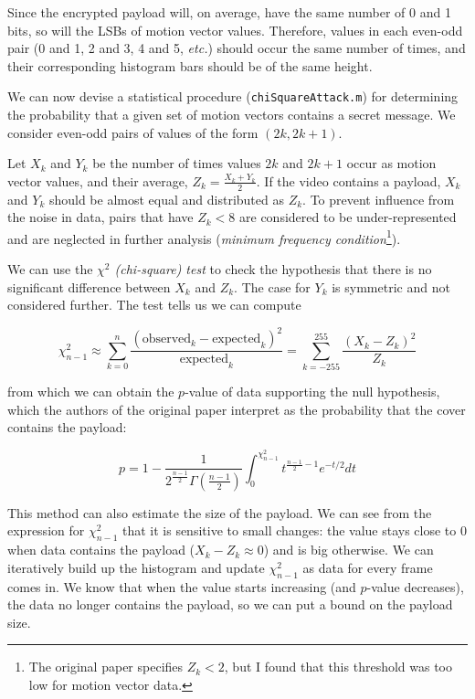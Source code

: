 \documentclass[12pt,british,twoside,notitlepage,usenames,dvipsnames,hypens,final]{report}
\numberwithin{equation}{section}
\numberwithin{figure}{section}
\begin{document}
Since the encrypted payload will, on average, have the same number of 0 and 1 bits, so will the LSBs of motion vector values. Therefore, values in each even-odd pair (0 and 1, 2 and 3, 4 and 5, \emph{etc.}) should occur the same number of times, and their corresponding histogram bars should be of the same height.

We can now devise a statistical procedure (\texttt{chiSquareAttack.m}) for determining the probability that a given set of motion vectors contains a secret message. We consider even-odd pairs of values of the form $(2k, 2k+1)$. 

Let $X_k$ and $Y_k$ be the number of times values $2k$ and $2k+1$ occur as motion vector values, and their average, $Z_k = \frac{X_k + Y_k}{2}$. If the video contains a payload, $X_k$ and $Y_k$ should be almost equal and distributed as $Z_k$. To prevent influence from the noise in data, pairs that have $Z_k < 8$ are considered to be under-represented and are neglected in further analysis (\emph{minimum frequency condition}\footnote{The original paper specifies $Z_k < 2$, but I found that this threshold was too low for motion vector data.}).

We can use the \emph{$\chi^2$ (chi-square) test} to check the hypothesis that there is no significant difference between $X_k$ and $Z_k$. The case for $Y_k$ is symmetric and not considered further. The test tells us we can compute

$$ \chi^2_{n-1} \approx \sum^{n}_{k=0} \frac{(\text{observed}_k - \text{expected}_k)^2}{\text{expected}_k}= \sum^{255}_{k=-255} \frac{(X_k - Z_k)^2}{Z_k} $$ 

from which we can obtain the $p$-value of data supporting the null hypothesis, which the authors of the original paper interpret as the probability that the cover contains the payload:

$$ p = 1 - \frac{1}{2^{\frac{n-1}{2}}\Gamma(\frac{n-1}{2})}\int_0^{\chi^2_{n-1}}t^{\frac{n-1}{2}−1}e^{-t/2}dt $$  

This method can also estimate the size of the payload. We can see from the expression for $\chi^2_{n-1}$ that it is sensitive to small changes: the value stays close to 0 when data contains the payload ($X_k - Z_k \approx 0$) and is big otherwise. We can iteratively build up the histogram and update $\chi^2_{n-1}$ as data for every frame comes in. We know that when the value starts increasing (and $p$-value decreases), the data no longer contains the payload, so we can put a bound on the payload size. 
\end{document}
